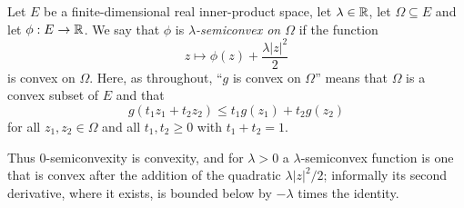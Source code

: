 \begin{definition}[Semiconvexity]
Let $E$ be a finite-dimensional real inner-product space, let $\lambda\in\mathbb{R}$, let
$\Omega\subseteq E$ and let $\phi:E\to\mathbb{R}$. We say that $\phi$ is
\emph{$\lambda$-semiconvex on $\Omega$} if the function
\[
  z\longmapsto\phi(z)+\frac{\lambda|z|^2}{2}
\]
is convex on $\Omega$. Here, as throughout, ``$g$ is convex on $\Omega$'' means
that $\Omega$ is a convex subset of $E$ and that
\[
  g(t_1z_1+t_2z_2)\le t_1g(z_1)+t_2g(z_2)
\]
for all $z_1,z_2\in\Omega$ and all $t_1,t_2\ge0$ with $t_1+t_2=1$.

Thus $0$-semiconvexity is convexity, and for $\lambda>0$ a
$\lambda$-semiconvex function is one that is convex after the addition of the
quadratic $\lambda|z|^2/2$; informally its second derivative, where it exists,
is bounded below by $-\lambda$ times the identity.
\end{definition}
